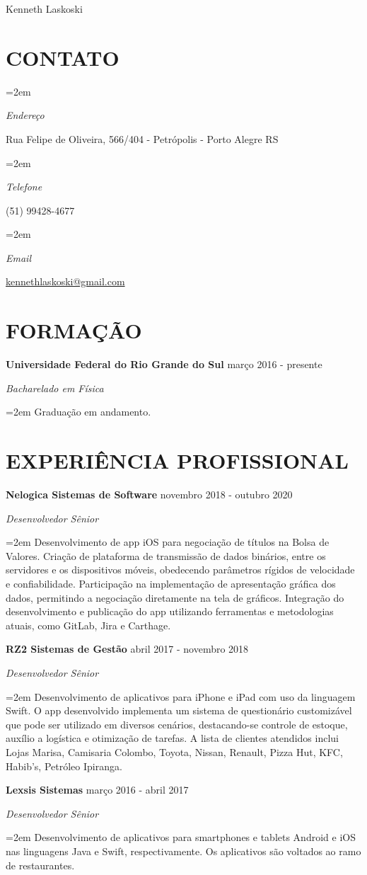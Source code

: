 \documentclass[paper=a4,fontsize=11pt]{scrartcl} %
\newlength{\spacebox}
\newcommand{\sepspace}{\vspace*{1em}}		%
\newcommand{\MyName}[1]{ %
		\Huge \usefont{OT1}{phv}{b}{n} \hfill #1
		\par \normalsize \normalfont}
\newcommand{\MySlogan}[1]{ %
		\large \usefont{OT1}{phv}{m}{n}\hfill \textit{#1}
		\par \normalsize \normalfont}
\newcommand{\NewPart}[1]{\section*{\uppercase{#1}}}
\newcommand{\PersonalEntry}[2]{
		\noindent\hangindent=2em\hangafter=0 %
		\parbox{\spacebox}{        %
		\textit{#1}}		       %
		\hspace{1.5em} #2 \par}    %
\newcommand{\EducationEntry}[4]{
		\noindent \textbf{#1} \hfill      %
        #2 \par
		\noindent \textit{#3} \par        %
		\noindent\hangindent=2em\hangafter=0 \small #4 %
		\normalsize \par}
\newcommand{\WorkEntry}[4]{				  %
		\noindent \textbf{#1} \hfill      %
        #2 \par
		\noindent \textit{#3} \par        %
		\noindent\hangindent=2em\hangafter=0 \small #4 %
		\normalsize \par}
\begin{document}

\MyName{Kenneth Laskoski}

\sepspace

\NewPart{Contato}{}

\PersonalEntry{Endereço}{Rua Felipe de Oliveira, 566/404 - Petrópolis - Porto Alegre RS}
\PersonalEntry{Telefone}{(51) 99428-4677}
\PersonalEntry{Email}{\url{kennethlaskoski@gmail.com}}

\NewPart{Formação}{}

\EducationEntry{Universidade Federal do Rio Grande do Sul}{março 2016 - presente}{Bacharelado em Física}{Graduação em andamento.}
\sepspace

\NewPart{Experiência Profissional}{}

\WorkEntry{Nelogica Sistemas de Software}{novembro 2018 - outubro 2020}{Desenvolvedor Sênior}{Desenvolvimento de app iOS para negociação de títulos na Bolsa de Valores. Criação de plataforma de transmissão de dados binários, entre os servidores e os dispositivos móveis, obedecendo parâmetros rígidos de velocidade e confiabilidade. Participação na implementação de apresentação gráfica dos dados, permitindo a negociação diretamente na tela de gráficos. Integração do desenvolvimento e publicação do app utilizando ferramentas e metodologias atuais, como GitLab, Jira e Carthage.}
\sepspace
\sepspace

\WorkEntry{RZ2 Sistemas de Gestão}{abril 2017 - novembro 2018}{Desenvolvedor Sênior}{Desenvolvimento de aplicativos para iPhone e iPad com uso da linguagem Swift. O app desenvolvido implementa um sistema de questionário customizável que pode ser utilizado em diversos cenários, destacando-se controle de estoque, auxílio a logística e otimização de tarefas. A lista de clientes atendidos inclui Lojas Marisa, Camisaria Colombo, Toyota, Nissan, Renault, Pizza Hut, KFC, Habib’s, Petróleo Ipiranga.}
\sepspace
\sepspace

\WorkEntry{Lexsis Sistemas}{março 2016 - abril 2017}{Desenvolvedor Sênior}{Desenvolvimento de aplicativos para smartphones e tablets Android e iOS nas linguagens Java e Swift, respectivamente. Os aplicativos são voltados ao ramo de restaurantes.}
\sepspace
\sepspace
\end{document}
